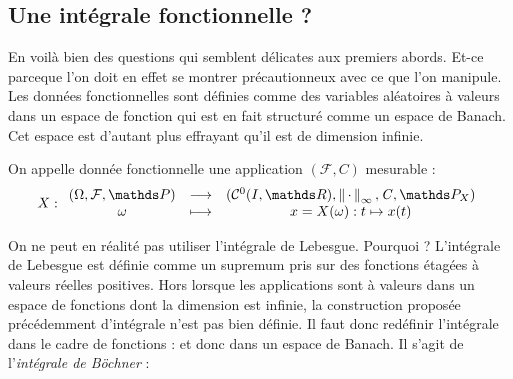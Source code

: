 \subsection{Une intégrale fonctionnelle ?}
{

    En voilà bien des questions qui semblent délicates aux premiers abords. Et-ce parceque l'on doit en effet se montrer précautionneux avec ce que l'on manipule. Les données fonctionnelles sont définies comme des variables aléatoires à valeurs dans un espace de fonction qui est en fait structuré comme un espace de Banach. Cet espace est d'autant plus effrayant qu'il est de dimension infinie.

    \begin{definition}
        On appelle donnée fonctionnelle une application $(\mathcal F, \mathit C)$ mesurable :
        \begin{equation*}
            X : \func{(\Omega, \mathcal F, \P)}{(\mathcal C^0(I, \mathds R), \norme{\infty}{\cdot}, \mathit C, \mathds P_X)}{\omega}{x = X(\omega) : t \mapsto x(t)}
        \end{equation*}
    \end{definition}
    

    On ne peut en réalité pas utiliser l'intégrale de Lebesgue. Pourquoi ? L'intégrale de Lebesgue est définie comme un supremum pris sur des fonctions étagées à valeurs réelles positives. Hors lorsque les applications sont à valeurs dans un espace de fonctions dont la dimension est infinie, la construction proposée précédemment d'intégrale n'est pas bien définie. Il faut donc redéfinir l'intégrale dans le cadre de fonctions : et donc dans un espace de Banach. Il s'agit de l'\emph{intégrale de Böchner} :




}
